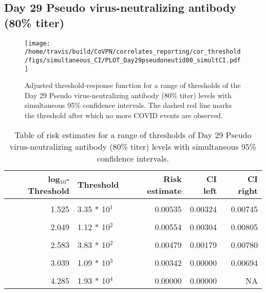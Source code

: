 \documentclass[]{book}
\theoremstyle{definition}
\theoremstyle{definition}
\theoremstyle{definition}
\newcommand{\1}{\mathbbm{1}}
\begin{document}
\newpage

\newpage

\newpage

\hypertarget{day-29-pseudo-virus-neutralizing-antibody-80-titer-2}{%
\subsection{Day 29 Pseudo virus-neutralizing antibody (80\% titer)}\label{day-29-pseudo-virus-neutralizing-antibody-80-titer-2}}

\begin{figure}[H]
\centering
\texttt{[image: /home/travis/build/CoVPN/correlates\_reporting/cor\_threshold/figs/simultaneous\_CI/PLOT\_Day29pseudoneutid80\_simultCI.pdf]}
\caption{Adjusted threshold-response function for a range of thresholds of the
  Day 29 Pseudo virus-neutralizing antibody (80\% titer) levels with simultaneous 95\% confidence intervals. The dashed red line marks the threshold after which no more COVID events are observed. }
\end{figure}
\begin{table}[!h]

\caption{\label{tab:unnamed-chunk-393}Table of risk estimates for a range of thresholds of Day 29 Pseudo virus-neutralizing antibody (80\% titer) levels with simultaneous 95\% confidence intervals.}
\centering
\begin{tabular}[t]{rlrrr}
\toprule
log$_{10}$-Threshold & Threshold & Risk estimate & CI left & CI right\\
\midrule
\cellcolor{gray!6}{0.699} & \cellcolor{gray!6}{5.00 * 10$^0$} & \cellcolor{gray!6}{0.00585} & \cellcolor{gray!6}{0.00382} & \cellcolor{gray!6}{0.00788}\\
1.525 & 3.35 * 10$^1$ & 0.00535 & 0.00324 & 0.00745\\
\cellcolor{gray!6}{1.840} & \cellcolor{gray!6}{6.92 * 10$^1$} & \cellcolor{gray!6}{0.00580} & \cellcolor{gray!6}{0.00341} & \cellcolor{gray!6}{0.00819}\\
2.049 & 1.12 * 10$^2$ & 0.00554 & 0.00304 & 0.00805\\
\cellcolor{gray!6}{2.276} & \cellcolor{gray!6}{1.89 * 10$^2$} & \cellcolor{gray!6}{0.00542} & \cellcolor{gray!6}{0.00269} & \cellcolor{gray!6}{0.00814}\\
2.583 & 3.83 * 10$^2$ & 0.00479 & 0.00179 & 0.00780\\
\cellcolor{gray!6}{2.785} & \cellcolor{gray!6}{6.10 * 10$^2$} & \cellcolor{gray!6}{0.00559} & \cellcolor{gray!6}{0.00172} & \cellcolor{gray!6}{0.00945}\\
3.039 & 1.09 * 10$^3$ & 0.00342 & 0.00000 & 0.00694\\
\cellcolor{gray!6}{3.351} & \cellcolor{gray!6}{2.24 * 10$^3$} & \cellcolor{gray!6}{0.00161} & \cellcolor{gray!6}{0.00000} & \cellcolor{gray!6}{0.00499}\\
4.285 & 1.93 * 10$^4$ & 0.00000 & 0.00000 & NA\\
\bottomrule
\end{tabular}
\end{table}
\end{document}

